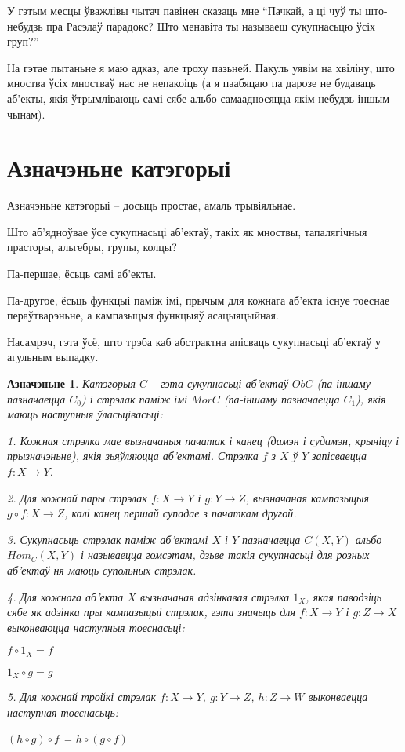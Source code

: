 \documentclass[a4paper,12pt]{book}
\newtheorem{definition}{Азначэньне}[section]
\begin{document}
У гэтым месцы ўважлівы чытач павінен сказаць мне ``Пачкай, а ці чуў ты
што-небудзь пра Расэлаў парадокс? Што менавіта ты называеш сукупнасьцю
ўсіх груп?''

На гэтае пытаньне я маю адказ, але троху пазьней. Пакуль уявім на
хвіліну, што мноства ўсіх мностваў нас не непакоіць (а я паабяцаю па
дарозе не будаваць аб'екты, якія ўтрымліваюць самі сябе альбо
самаадносяцца якім-небудзь іншым чынам).

\section{Азначэньне катэгорыі}

Азначэньне катэгорыі -- досыць простае, амаль трывіяльнае.

Што аб'ядноўвае ўсе сукупнасьці аб'ектаў, такіх як мноствы,
тапалягічныя прасторы, альгебры, групы, колцы?

Па-першае, ёсьць самі аб'екты.

Па-другое, ёсьць функцыі паміж імі, прычым для кожнага аб'екта існуе
тоеснае пераўтварэньне, а кампазыцыя функцыяў асацыяцыйная.

Насамрэч, гэта ўсё, што трэба каб абстрактна апісваць сукупнасьці
аб'ектаў у агульным выпадку.

\begin{definition}
  Катэгорыя $C$ -- гэта сукупнасьці аб'ектаў ${Ob C}$ (па-іншаму
  пазначаецца $C_0$) і стрэлак паміж
  імі ${Mor C}$ (па-іншаму пазначаецца $C_1$), якія  маюць наступныя
  ўласьцівасьці:

  1. Кожная стрэлка мае вызначаныя пачатак і канец (дамэн і судамэн,
  крыніцу і прызначэньне),
  якія зьяўляюцца аб'ектамі. Стрэлка $f$ з $X$ ў $Y$ запісваецца
  ${f:X\rightarrow Y}$.

  2. Для кожнай пары стрэлак ${f:X\rightarrow Y}$ і ${g:Y\rightarrow
    Z}$, вызначаная кампазыцыя ${g \circ f:X\rightarrow Z}$, калі канец першай
  супадае з пачаткам другой.

  3. Сукупнасьць стрэлак паміж аб'ектамі $X$ і $Y$ пазначаецца
  $C(X,Y)$ альбо $Hom_C(X, Y)$ і называецца гомсэтам, дзьве такія
  сукупнасьці для розных аб'ектаў ня маюць
  супольных стрэлак.

  4. Для кожнага аб'екта $X$ вызначаная адзінкавая стрэлка $1_X$, якая
  паводзіць сябе як адзінка пры кампазыцыі стрэлак, гэта значыць для
  ${f:X \rightarrow Y}$ і ${g:Z\rightarrow X}$ выконваюцца наступныя
  тоеснасьці:

  $f \circ 1_X = f$

  $1_X \circ g = g$

  5. Для кожнай тройкі стрэлак ${f: X\rightarrow Y}$, ${g:Y\rightarrow
    Z}$, ${h:Z\rightarrow W}$ выконваецца наступная тоеснасьць:

  $(h \circ g) \circ f$ = $h \circ (g \circ f)$
\end{definition}
\end{document}

